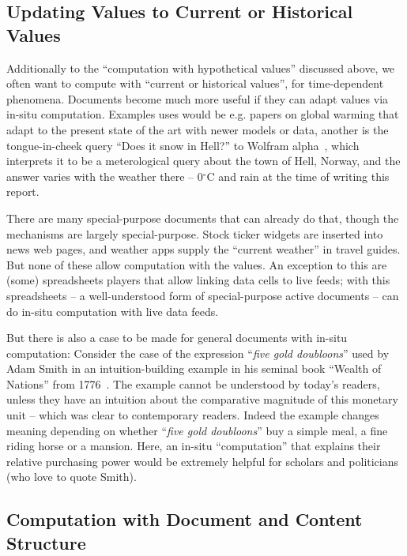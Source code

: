 \subsection{Updating Values to Current or Historical Values}\label{sec:ex:current}

Additionally to the ``computation with hypothetical values'' discussed above, we often
want to compute with ``current or historical values'', for time-dependent
phenomena. Documents become much more useful if they can adapt values via in-situ
computation. Examples uses would be e.g. papers on global warming that adapt to the
present state of the art with newer models or data, another is the tongue-in-cheek query
``Does it snow in Hell?'' to Wolfram alpha~\cite{WolframAlpha:on}, which interprets it to
be a meterological query about the town of Hell, Norway, and the answer varies with the
weather there -- 0$^\circ$C and rain at the time of writing this report.

There are many special-purpose documents that can already do that, though the mechanisms
are largely special-purpose. Stock ticker widgets are inserted into news web pages, and
weather apps supply the ``current weather'' in travel guides. But none of these allow
computation with the values. An exception to this are (some) spreadsheets players that
allow linking data cells to live feeds; with this spreadsheets -- a well-understood form
of special-purpose active documents -- can do in-situ computation with live data feeds.

But there is also a case to be made for general documents with in-situ computation:
Consider the case of the expression ``\emph{five gold doubloons}'' used by Adam Smith in
an intuition-building example in his seminal book ``Wealth of Nations'' from
1776~\cite{Smith:WoN1776}. The example cannot be understood by today's readers, unless
they have an intuition about the comparative magnitude of this monetary unit -- which was clear
to contemporary readers. Indeed the example changes meaning depending on whether
``\emph{five gold doubloons}'' buy a simple meal, a fine riding horse or a mansion. Here,
an in-situ ``computation'' that explains their relative purchasing power would be
extremely helpful for scholars and politicians (who love to quote Smith).

\subsection{Computation with Document and Content Structure}\label{sec:ex:docstruct}

